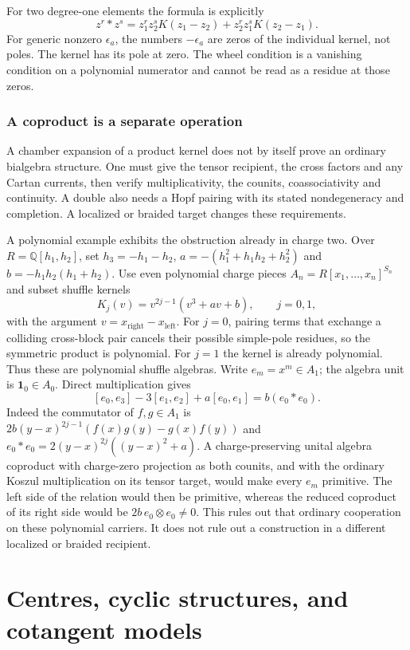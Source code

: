 For two degree-one elements the formula is explicitly
\[
 z^r*z^s=z_1^rz_2^sK(z_1-z_2)+z_2^rz_1^sK(z_2-z_1).
\]
For generic nonzero $\epsilon_a$, the numbers $-\epsilon_a$ are zeros of the
individual kernel, not poles. The kernel has its pole at zero.
The wheel condition is a vanishing condition on a polynomial numerator and
cannot be read as a residue at those zeros.

\subsection{A coproduct is a separate operation}
A chamber expansion of a product kernel does not by itself prove an ordinary
bialgebra structure. One must give the tensor recipient, the cross factors and
any Cartan currents, then verify multiplicativity, the counits, coassociativity
and continuity. A double also needs a Hopf pairing with its stated nondegeneracy
and completion. A localized or braided target changes these requirements.

A polynomial example exhibits the obstruction already in charge two.
Over $R=\mathbb Q[h_1,h_2]$, set $h_3=-h_1-h_2$,
$a=-(h_1^2+h_1h_2+h_2^2)$ and $b=-h_1h_2(h_1+h_2)$.
Use even polynomial charge pieces $A_n=R[x_1,\ldots,x_n]^{S_n}$ and subset
shuffle kernels
\[
 K_j(v)=v^{2j-1}(v^3+av+b),\qquad j=0,1,
\]
with the argument $v=x_{\mathrm{right}}-x_{\mathrm{left}}$.
For $j=0$, pairing terms that exchange a colliding cross-block pair cancels
their possible simple-pole residues, so the symmetric product is polynomial.
For $j=1$ the kernel is already polynomial. Thus these are polynomial shuffle algebras.
Write $e_m=x^m\in A_1$; the algebra unit is $\mathbf1_0\in A_0$.
Direct multiplication gives
\[
 [e_0,e_3]-3[e_1,e_2]+a[e_0,e_1]=b(e_0*e_0).
\]
Indeed the commutator of $f,g\in A_1$ is
$2b(y-x)^{2j-1}(f(x)g(y)-g(x)f(y))$ and
$e_0*e_0=2(y-x)^{2j}((y-x)^2+a)$.
A charge-preserving unital algebra coproduct with charge-zero projection as
both counits, and with the ordinary Koszul multiplication on its tensor target,
would make every $e_m$ primitive.
The left side of the relation would then be primitive, whereas the reduced
coproduct of its right side would be $2b\,e_0\otimes e_0\ne0$.
This rules out that ordinary cooperation on these polynomial carriers.
It does not rule out a construction in a different localized or braided recipient.

\chapter{Centres, cyclic structures, and cotangent models}

